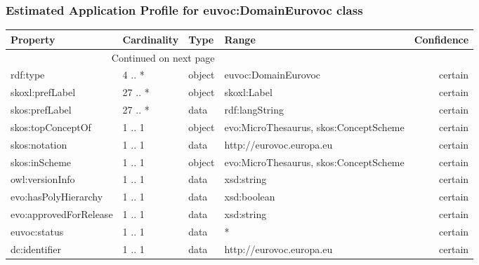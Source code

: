 \documentclass[10pt,a4paper,titlepage,final]{article}
\begin{document}
\subsubsection{Estimated Application Profile for euvoc:DomainEurovoc class}
\begin{tabularx}{\textwidth}{lllXr}
\toprule
               Property & Cardinality &    Type &                                   Range & Confidence \\
\midrule
\endhead
\midrule
\multicolumn{3}{r}{{Continued on next page}} \\
\midrule
\endfoot

\bottomrule
\endlastfoot
               rdf:type &      4 .. * &  object &                     euvoc:DomainEurovoc &    certain \\
        skoxl:prefLabel &     27 .. * &  object &                             skoxl:Label &    certain \\
         skos:prefLabel &     27 .. * &    data &                          rdf:langString &    certain \\
      skos:topConceptOf &      1 .. 1 &  object &  evo:MicroThesaurus, skos:ConceptScheme &    certain \\
          skos:notation &      1 .. 1 &    data &                http://eurovoc.europa.eu &    certain \\
          skos:inScheme &      1 .. 1 &  object &  evo:MicroThesaurus, skos:ConceptScheme &    certain \\
        owl:versionInfo &      1 .. 1 &    data &                              xsd:string &    certain \\
   evo:hasPolyHierarchy &      1 .. 1 &    data &                             xsd:boolean &    certain \\
 evo:approvedForRelease &      1 .. 1 &    data &                              xsd:string &    certain \\
           euvoc:status &      1 .. 1 &    data &                                       * &    certain \\
          dc:identifier &      1 .. 1 &    data &                http://eurovoc.europa.eu &    certain \\
\end{tabularx}
\end{document}
